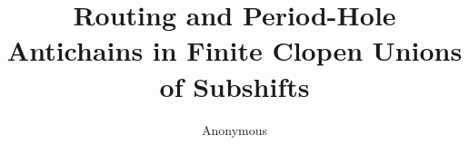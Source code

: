 \documentclass[11pt,reqno]{amsart}
\title[Routing and period-hole antichains]{Routing and Period-Hole Antichains
in Finite Clopen Unions of Subshifts}
\author{Anonymous}
\date{}
\theoremstyle{definition}
\theoremstyle{remark}
\begin{document}
\begin{abstract}

\end{abstract}

\maketitle











\end{document}

